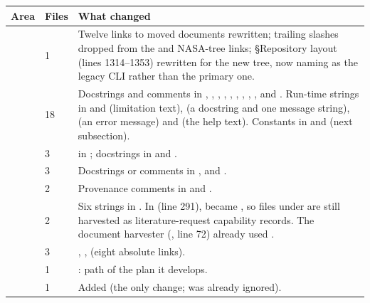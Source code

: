 {\small
\begin{longtable}{P{3.6cm}P{0.9cm}P{10.9cm}}
\toprule
Area & Files & What changed \\
\midrule
\endhead
{} & 1 & Twelve links to moved documents rewritten; trailing slashes dropped from the  and NASA-tree links; §Repository layout (lines 1314--1353) rewritten for the new tree, now naming  as the legacy CLI rather than the primary one. \\
 & 18 & Docstrings and comments in , , , , , , , , ,  and . Run-time strings in  and  (limitation text),  (a docstring and one message string),  (an error message) and  (the  help text). Constants in  and  (next subsection). \\
 & 3 &  in ; docstrings in  and . \\
 & 3 & Docstrings or comments in ,  and . \\
 & 2 & Provenance comments in  and . \\
 & 2 & Six  strings in . In  (line 291),  became , so  files under  are still harvested as literature-request capability records. The document harvester (, line 72) already used . \\
 & 3 & , ,  (eight absolute links). \\
 & 1 & : path of the plan it develops. \\
 & 1 & Added  (the only change;  was already ignored). \\
\bottomrule
\end{longtable}}

